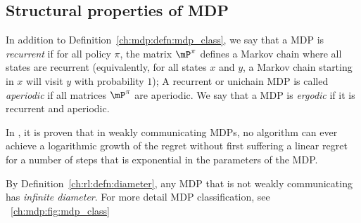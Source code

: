 

\subsection{Structural properties of MDP}
\label{ssec:mdp_params}

In addition to Definition~\ref{ch:mdp:defn:mdp_class}, we say that a MDP is \emph{recurrent} if for all policy $\pi$, the matrix $\mP^\pi$ defines a Markov chain where all states are recurrent (equivalently, for all states $x$ and $y$, a Markov chain starting in $x$ will visit $y$ with probability $1$);
A recurrent or unichain MDP is called \emph{aperiodic} if all matrices $\mP^\pi$ are aperiodic.  We say that a MDP is \emph{ergodic} if it is recurrent and aperiodic. 

In \cite{fruit2018near}, it is proven that in weakly communicating MDPs, no algorithm can ever achieve a logarithmic growth of the regret without first suffering a linear regret for a number of steps that is exponential in the parameters of the MDP.

By Definition~\ref{ch:rl:defn:diameter}, any MDP that is not weakly communicating has \emph{infinite diameter}.
For more detail MDP classification, see \figurename~\ref{ch:mdp:fig:mdp_class}

